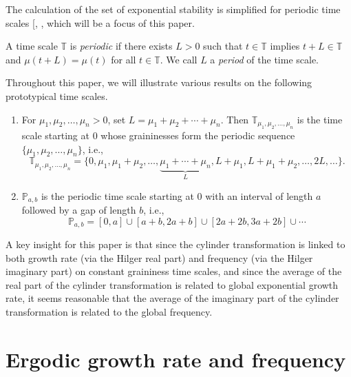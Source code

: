 \documentclass[reqno]{amsart}
\begin{document}
The calculation of the set of exponential stability is simplified for periodic
time scales [\cite[Lemma~3.4(b)]{PoSiWi}, , which will be a focus of this paper.

\begin{definition} \rm
 A time scale $\mathbb{T}$ is \emph{periodic} if there exists $L>0$ such that
 $t \in \mathbb{T}$ implies $t+L \in \mathbb{T}$ and $\mu(t+L)=\mu(t)$ for all $t \in \mathbb{T}$.
We call $L$ a \emph{period} of the time scale.
\end{definition}


\begin{remark} \rm
Throughout this paper, we will illustrate various results on the following
prototypical time scales.
 \begin{enumerate}
 \item For $\mu_1,\mu_2,\dots,\mu_n>0$, set $L=\mu_1+\mu_2+\cdots+\mu_n$.
 Then $\mathbb{T}_{\mu_1,\mu_2,\dots,\mu_n}$ is the time scale starting at 0 whose
 graininesses form the periodic sequence $\{\mu_1,\mu_2,\dots,\mu_n\}$, i.e.,
 $$
 \mathbb{T}_{\mu_1,\mu_2,\dots,\mu_n}
 =\Big\{0,\mu_1,\mu_1+\mu_2,\dots,\underbrace{\mu_1+\cdots+\mu_n}_{L},
 L+\mu_1,L+\mu_1+\mu_2,\dots,2L,\dots\Big\}.
 $$

 \item $\mathbb{P}_{a,b}$ is the periodic time scale starting at 0 with an
 interval of length $a$ followed by a gap of length $b$, i.e.,
 $$
 \mathbb{P}_{a,b}=[0,a]\cup[a+b,2a+b]\cup[2a+2b,3a+2b]\cup\cdots
 $$
\end{enumerate}
\end{remark}

A key insight for this paper is that since the cylinder transformation is linked to both
growth rate (via the Hilger real part) and frequency (via the Hilger imaginary part) on
constant graininess time scales, and since the average of the real part of the cylinder
transformation is related to global exponential growth rate, it seems reasonable that
the average of the imaginary part of the cylinder transformation is related to the
global frequency. 

\section{Ergodic growth rate and frequency}
\end{document}
